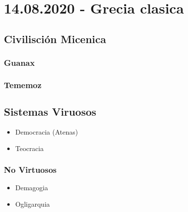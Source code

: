\documentclass[a4paper]{book}
\begin{document}
\section{14.08.2020 - Grecia clasica}
\label{sec:grecia_clasica}

\subsection{Civilisción Micenica}
\label{ssec:civiliscion_micenica}

\subsubsection{Guanax}
\label{ssec:guanax}


\subsubsection{Tememoz}
\label{ssec:tememoz}

\subsection{Sistemas Viruosos}
\label{ssec:sistemas_viruosos}

\begin{itemize}
    \item Democracia (Atenas)
    \item Teocracia
\end{itemize}

\subsubsection{No Virtuosos}
\label{ssec:no_virtuosos}

\begin{itemize}
    \item Demagogia
    \item Ogligarquia
\end{itemize}
\end{document}
